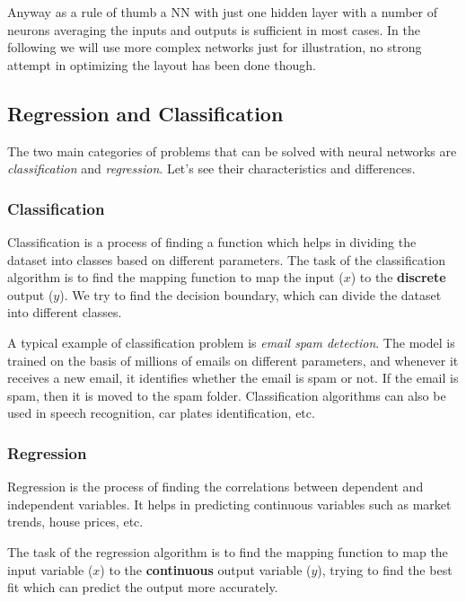 Anyway as a rule of thumb a NN with just one hidden layer with a number
of neurons averaging the inputs and outputs is sufficient in most cases.
In the following we will use more complex networks just for
illustration, no strong attempt in optimizing the layout has been done
though.

\subsection{Regression and Classification}\label{regression-and-classification}

The two main categories of problems that can be solved with neural
networks are \emph{classification} and \emph{regression}. Let's see
their characteristics and differences.

\subsubsection{Classification}\label{classification}

Classification is a process of finding a function which helps in dividing
the dataset into classes based on different parameters. 
The task of the classification algorithm is to find the mapping function
to map the input (\(x\)) to the \textbf{discrete} output (\(y\)). We try
to find the decision boundary, which can divide the dataset into
different classes.

A typical example of classification problem is
\emph{email spam detection}. The model is trained on the basis of millions of
emails on different parameters, and whenever it receives a new email, it
identifies whether the email is spam or not. If the email is spam, then
it is moved to the spam folder. Classification algorithms can also be used in
speech recognition, car plates identification, etc.

\subsubsection{Regression}\label{regression}

Regression is the process of finding the correlations between dependent
and independent variables. It helps in predicting continuous
variables such as market trends, house prices, etc.

The task of the regression algorithm is to find the mapping function to
map the input variable (\(x\)) to the \textbf{continuous} output
variable (\(y\)), trying to find the best fit which can predict the
output more accurately.

